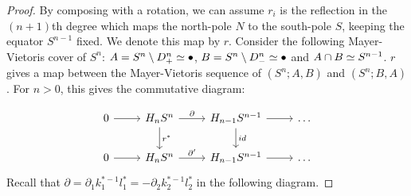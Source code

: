 \begin{proof}
By composing with a rotation, we can assume $r_i$ is the reflection in the $(n+1)$th degree which maps the north-pole $N$ to the south-pole $S$, keeping the equator $S^{n-1}$ fixed. We denote this map by $r$. Consider the following Mayer-Vietoris cover of $S^n$:  $A=S^n\setminus D^n_+\simeq \bullet$, $B=S^n\setminus D^n_-\simeq \bullet$ and $A\cap B \simeq S^{n-1}$. $r$ gives a map between the Mayer-Vietoris sequence of $(S^n;A,B)$ and $(S^n;B,A)$. For $n>0$, this gives the commutative diagram:

\[\begin{tikzcd}
0 \arrow[r] & H_nS^n \arrow[d, "r^*"] \arrow[r, "\partial"] & H_{n-1}S^{n-1} \arrow[d, "id"] \arrow[r] & \dots \\
0 \arrow[r] & H_nS^n \arrow[r, "\partial'"]                 & H_{n-1}S^{n-1} \arrow[r]                 & \dots
\end{tikzcd}\]
Recall that $\partial=\partial_1k_1^{*-1}l_1^*=-\partial_2k_2^{*-1}l_2^*$ in the following diagram.


\end{proof}
